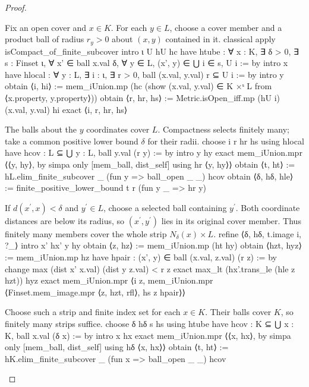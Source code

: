 \begin{proof}
  \begin{lean}{Fix an open cover and $x\in K$. For each $y\in L$, choose a cover member and a product ball of radius $r_y>0$ about $(x,y)$ contained in it.}
    classical
    apply isCompact_of_finite_subcover
    intro ι U hU hc
    have htube : ∀ x : K, ∃ δ > 0, ∃ s : Finset ι,
        ∀ x' ∈ ball x.val δ, ∀ y ∈ L, (x', y) ∈ ⋃ i ∈ s, U i := by
      intro x
      have hlocal : ∀ y : L, ∃ i : ι, ∃ r > 0, ball (x.val, y.val) r ⊆ U i := by
        intro y
        obtain ⟨i, hi⟩ := mem_iUnion.mp (hc (show (x.val, y.val) ∈ K ×ˢ L from ⟨x.property, y.property⟩))
        obtain ⟨r, hr, hs⟩ := Metric.isOpen_iff.mp (hU i) (x.val, y.val) hi
        exact ⟨i, r, hr, hs⟩
  \end{lean}

  \begin{lean}{The balls about the $y$ coordinates cover $L$. Compactness selects finitely many; take a common positive lower bound $\delta$ for their radii.}
    choose i r hr hs using hlocal
    have hcov : L ⊆ ⋃ y : L, ball y.val (r y) := by
      intro y hy
      exact mem_iUnion.mpr ⟨⟨y, hy⟩, by simpa only [mem_ball, dist_self] using hr ⟨y, hy⟩⟩
    obtain ⟨t, ht⟩ := hL.elim_finite_subcover _ (fun y => ball_open _ _) hcov
    obtain ⟨δ, hδ, hle⟩ := finite_positive_lower_bound t r (fun y _ => hr y)
  \end{lean}

  \begin{lean}{If $d(x^{\prime},x)<\delta$ and $y^{\prime}\in L$, choose a selected ball containing $y^{\prime}$. Both coordinate distances are below its radius, so $(x^{\prime},y^{\prime})$ lies in its original cover member. Thus finitely many members cover the whole strip $N_\delta(x)\times L$.}
    refine ⟨δ, hδ, t.image i, ?_⟩
    intro x' hx' y hy
    obtain ⟨z, hz⟩ := mem_iUnion.mp (ht hy)
    obtain ⟨hzt, hyz⟩ := mem_iUnion.mp hz
    have hpair : (x', y) ∈ ball (x.val, z.val) (r z) := by
      change max (dist x' x.val) (dist y z.val) < r z
      exact max_lt (hx'.trans_le (hle z hzt)) hyz
    exact mem_iUnion.mpr ⟨i z, mem_iUnion.mpr ⟨Finset.mem_image.mpr ⟨z, hzt, rfl⟩, hs z hpair⟩⟩
  \end{lean}

  \begin{lean}{Choose such a strip and finite index set for each $x\in K$. Their balls cover $K$, so finitely many strips suffice.}
    choose δ hδ s hs using htube
    have hcov : K ⊆ ⋃ x : K, ball x.val (δ x) := by
      intro x hx
      exact mem_iUnion.mpr ⟨⟨x, hx⟩, by simpa only [mem_ball, dist_self] using hδ ⟨x, hx⟩⟩
    obtain ⟨t, ht⟩ := hK.elim_finite_subcover _ (fun x => ball_open _ _) hcov
  \end{lean}


\end{proof}
